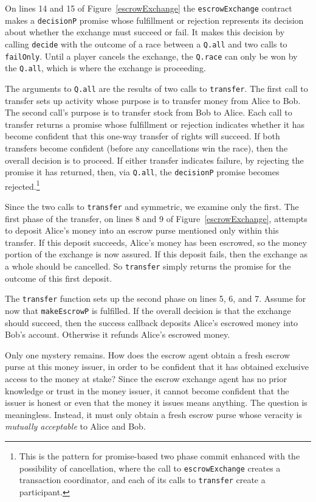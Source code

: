 \documentclass{llncs}
\begin{document}
On lines 14 and 15 of Figure~\ref{escrowExchange} the {\tt escrowExchange} contract makes a {\tt decisionP} promise whose fulfillment or rejection represents its decision about whether the exchange must succeed or fail. It makes this decision by calling {\tt decide} with the outcome of a race between a {\tt Q.all} and two calls to {\tt failOnly}. Until a player cancels the exchange, the {\tt Q.race} can only be won by the {\tt Q.all}, which is where the exchange is proceeding.

The arguments to {\tt Q.all} are the results of two calls to {\tt transfer}. The first call to transfer sets up activity whose purpose is to transfer money from Alice to Bob. The second call's purpose is to transfer stock from Bob to Alice. Each call to transfer returns a promise whose fulfillment or rejection indicates whether it has become confident that this one-way transfer of rights will succeed. If both transfers become confident (before any cancellations win the race), then the overall decision is to proceed. If either transfer indicates failure, by rejecting the promise it has returned, then, via {\tt Q.all}, the {\tt decisionP} promise becomes rejected.\footnote{This is the pattern for promise-based two phase commit enhanced with the possibility of cancellation, where the call to {\tt escrowExchange} creates a transaction coordinator, and each of its calls to {\tt transfer} create a participant.}

Since the two calls to {\tt transfer} and symmetric, we examine only the first. The first phase of the transfer, on lines 8 and 9 of Figure~\ref{escrowExchange}, attempts to deposit Alice's money into an escrow purse mentioned only within this transfer. If this deposit succeeds, Alice's money has been escrowed, so the money portion of the exchange is now assured. If this deposit fails, then the exchange as a whole should be cancelled. So {\tt transfer} simply returns the promise for the outcome of this first deposit.

The {\tt transfer} function sets up the second phase on lines 5, 6, and 7. Assume for now that {\tt makeEscrowP} is fulfilled. If the overall decision is that the exchange should succeed, then the success callback deposits Alice's escrowed money into Bob's account. Otherwise it refunds Alice's escrowed money.

Only one mystery remains. How does the escrow agent obtain a fresh escrow purse at this money issuer, in order to be confident that it has obtained exclusive access to the money at stake? Since the escrow exchange agent has no prior knowledge or trust in the money issuer, it cannot become confident that the issuer is honest or even that the money it issues means anything. The question is meaningless. Instead, it must only obtain a fresh escrow purse whose veracity is \emph{mutually acceptable} to Alice and Bob.
\end{document}
